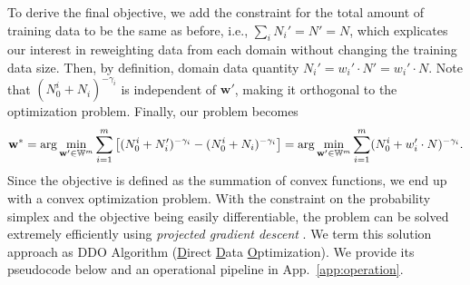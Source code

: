 \documentclass{article} %
\newcommand{\ruoxi}[1]{\textbf{\textcolor{blue}{#1}}}
\begin{document}



To derive the final objective, we add the constraint for the total amount of training data to be the same as before, i.e., $\sum_i N_i' = N' = N$, which explicates our interest in reweighting data from each domain without changing the training data size. %
Then, by definition, domain data quantity $N_i'=w_i'\cdot N'=w_i'\cdot N$.
Note that $(N_0^i+N_i)^{-\gamma_i}$ is independent of $\mathbf{w}'$, making it orthogonal to the optimization problem. Finally, our problem becomes
\vspace{-0.5em}\begin{equation*}
    \mathbf{w^*} =\arg\min_{\mathbf{w'}\in \mathbb{W}^m}\sum_{i=1}^m \left[ (N_0^i+N_i')^{-\gamma_i}- (N_0^i+N_i)^{-\gamma_i} \right] =\arg\min_{\mathbf{w'}\in \mathbb{W}^m}\sum_{i=1}^m (N_0^i+w_i'\cdot N)^{-\gamma_i}. \vspace{-0.5em}
\end{equation*}
Since the objective is defined as the summation of convex functions, we end up with a convex optimization problem. With the constraint on the probability simplex and the objective being easily differentiable, the problem can be solved extremely efficiently using \textit{projected gradient descent} \citep{bertsekas1997nonlinear}. We term this solution approach as \textsc{DDO} Algorithm (\underline{D}irect \underline{D}ata \underline{O}ptimization). We provide its pseudocode below and an operational pipeline in App.~\ref{app:operation}.
\end{document}
